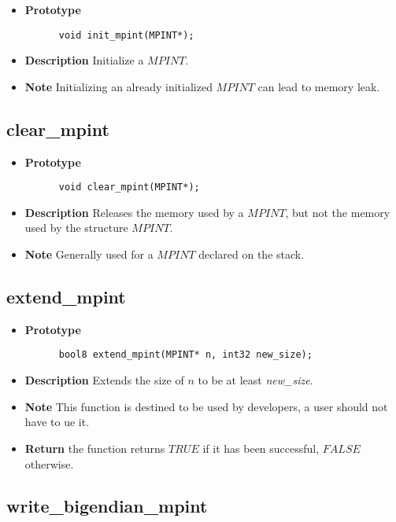 \documentclass[10pt,a4paper]{article}
\begin{document}
  \begin{itemize}
    \item [] \textbf{Prototype}
    \begin{lstlisting}
      void init_mpint(MPINT*);
    \end{lstlisting}
    \item [] \textbf{Description} Initialize a $MPINT$.
    \item [] \textbf{Note} Initializing an already initialized $MPINT$ can lead to memory leak.
  \end{itemize}
  
  \subsection{clear\_mpint}
  
  \begin{itemize}
    \item [] \textbf{Prototype}
    \begin{lstlisting}
      void clear_mpint(MPINT*);
    \end{lstlisting}
    \item [] \textbf{Description} Releases the memory used by a $MPINT$, but not the memory used by the structure $MPINT$.
    \item [] \textbf{Note} Generally used for a $MPINT$ declared on the stack.
  \end{itemize}
  
  \subsection{extend\_mpint}
  
  \begin{itemize}
    \item [] \textbf{Prototype}
    \begin{lstlisting}
      bool8 extend_mpint(MPINT* n, int32 new_size);
    \end{lstlisting}
    \item [] \textbf{Description} Extends the size of $n$ to be at least \textit{new\_size}.
    \item [] \textbf{Note} This function is destined to be used by developers, a user should not have to ue it.
    \item [] \textbf{Return} the function returns $TRUE$ if it has been successful, $FALSE$ otherwise.
  \end{itemize}
  
  \subsection{write\_bigendian\_mpint}
  
\end{document}
